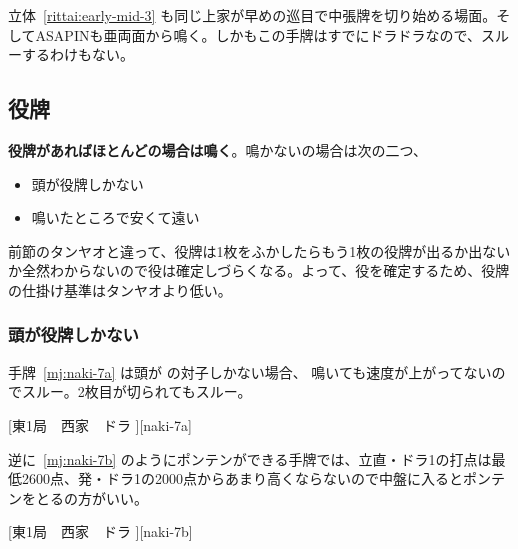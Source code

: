 \documentclass[../nankiru_main.tex]{subfiles}
\begin{document}
立体~\ref{rittai:early-mid-3} も同じ上家が早めの巡目で中張牌を切り始める場面。そしてASAPINも亜両面から鳴く。しかもこの手牌はすでにドラドラなので、スルーするわけもない\citep{hououlab-1}。

\begin{rittai}[h]
  \centering
  
  
  \caption{上家が3巡目で中張牌の  を切る場合}
  \label{rittai:early-mid-3}
\end{rittai}

\subsection{役牌}

\textbf{役牌があればほとんどの場合は鳴く}。鳴かないの場合は次の二つ\citep[][p.~103]{hirasawa-naki}、

\begin{itemize}
\item 頭が役牌しかない
\item 鳴いたところで安くて遠い
\end{itemize}

前節のタンヤオと違って、役牌は1枚をふかしたらもう1枚の役牌が出るか出ないか全然わからないので役は確定しづらくなる。よって、役を確定するため、役牌の仕掛け基準はタンヤオより低い。


\subsubsection*{頭が役牌しかない} 

手牌~\ref{mj:naki-7a} は頭が  の対子しかない場合、 鳴いても速度が上がってないのでスルー。2枚目が切られてもスルー\citep[][p.~104]{hirasawa-naki}。

[東1局　西家　ドラ ][naki-7a]

逆に~\ref{mj:naki-7b} のようにポンテンができる手牌では、立直・ドラ1の打点は最低2600点、発・ドラ1の2000点からあまり高くならないので中盤に入るとポンテンをとるの方がいい\citep[][pp.~105--106]{hirasawa-naki}。

[東1局　西家　ドラ ][naki-7b]
\end{document}
